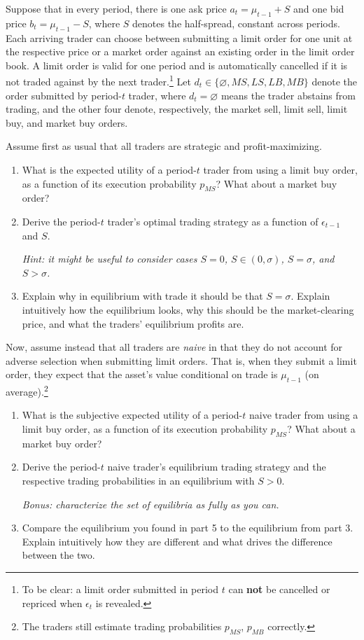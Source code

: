 \documentclass[a4paper]{article}
\begin{document}
Suppose that in every period, there is one ask price $a_t = \mu_{t-1} + S$ and one bid price $b_t = \mu_{t-1} - S$, where $S$ denotes the half-spread, constant across periods. 
Each arriving trader can choose between submitting a limit order for one unit at the respective price or a market order against an existing order in the limit order book. A limit order is valid for one period and is automatically cancelled if it is not traded against by the next trader.\footnote{To be clear: a limit order submitted in period $t$ can \textbf{not} be cancelled or repriced when $\epsilon_t$ is revealed.}
Let $d_t \in \{\varnothing,MS,LS,LB,MB\}$ denote the order submitted by period-$t$ trader, where $d_t = \varnothing$ means the trader abstains from trading, and the other four denote, respectively, the market sell, limit sell, limit buy, and market buy orders.

Assume first as usual that all traders are strategic and profit-maximizing.

\begin{enumerate}
	\item What is the expected utility of a period-$t$ trader from using a limit buy order, as a function of its execution probability $p_{MS}$? What about a market buy order?
	
	\item Derive the period-$t$ trader's optimal trading strategy as a function of $\epsilon_{t-1}$ and $S$.
	
	\emph{Hint: it might be useful to consider cases $S=0$, $S\in (0,\sigma)$, $S=\sigma$, and $S>\sigma$.}
	
	\item Explain why in equilibrium with trade it should be that $S=\sigma$. Explain intuitively how the equilibrium looks, why this should be the market-clearing price, and what the traders' equilibrium profits are.
\end{enumerate}

Now, assume instead that all traders are \emph{naive} in that they do not account for adverse selection when submitting limit orders. That is, when they submit a limit order, they expect that the asset's value conditional on trade is $\mu_{t-1}$ (on average).\footnote{The traders still estimate trading probabilities $p_{MS}$, $p_{MB}$ correctly.}

\begin{enumerate}[resume]
	\item What is the subjective expected utility of a period-$t$ naive trader from using a limit buy order, as a function of its execution probability $p_{MS}$? What about a market buy order?
	
	\item Derive the period-$t$ naive trader's equilibrium trading strategy and the respective trading probabilities in an equilibrium with $S>0$.
	
	\emph{Bonus: characterize the set of equilibria as fully as you can.}
	
	\item Compare the equilibrium you found in part 5 to the equilibrium from part 3. Explain intuitively how they are different and what drives the difference between the two.
\end{enumerate}
\end{document}
